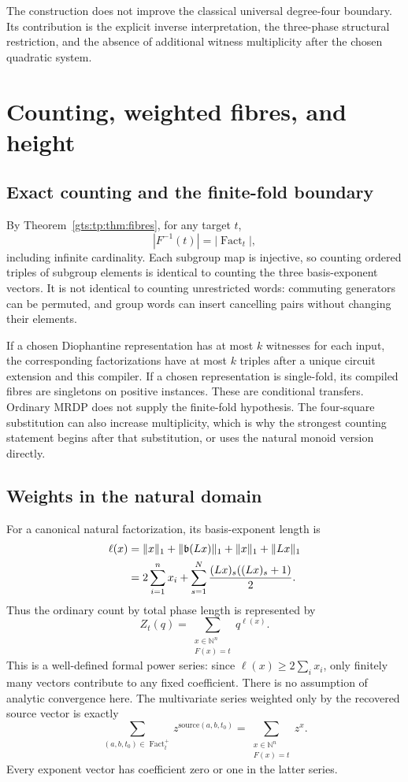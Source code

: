 \documentclass[11pt,letterpaper]{article}
\theoremstyle{definition}
\theoremstyle{remark}
\newcommand{\F}{F(a,b)}
\newcommand{\NN}{\mathbb N}
\newcommand{\bn}{\mathfrak b}
\DeclareMathOperator{\Fact}{Fact}
\begin{document}
The construction does not improve the classical universal degree-four
boundary. Its contribution is the explicit inverse interpretation, the
three-phase structural restriction, and the absence of additional witness
multiplicity after the chosen quadratic system.

\section{Counting, weighted fibres, and height}
\label{gts:tp:sec:height}

\subsection{Exact counting and the finite-fold boundary}
By Theorem~\ref{gts:tp:thm:fibres}, for any target $t$,
\[
                     |F^{-1}(t)|=|\Fact_t|,
\]
including infinite cardinality. Each subgroup map is injective, so counting
ordered triples of subgroup elements is identical to counting the three
basis-exponent vectors. It is not identical to counting unrestricted words:
commuting generators can be permuted, and group words can insert cancelling
pairs without changing their elements.

If a chosen Diophantine representation has at most $k$ witnesses for each
input, the corresponding factorizations have at most $k$ triples after a
unique circuit extension and this compiler. If a chosen representation is
single-fold, its compiled fibres are singletons on positive instances.
These are conditional transfers. Ordinary MRDP does not supply the
finite-fold hypothesis. The four-square substitution can also increase
multiplicity, which is why the strongest counting statement begins after
that substitution, or uses the natural monoid version directly.

\subsection{Weights in the natural domain}
For a canonical natural factorization, its basis-exponent length is
\begin{align}
 \ell(x)&=\|x\|_1+\|\bn(Lx)\|_1+\|x\|_1+\|Lx\|_1\notag\\
        &=2\sum_{i=1}^n x_i
          +\sum_{s=1}^N\frac{(Lx)_s((Lx)_s+1)}2.
 \label{gts:tp:eq:length}
\end{align}
Thus the ordinary count by total phase length is represented by
\begin{equation}\label{gts:tp:eq:series}
            Z_t(q)=\sum_{\substack{x\in\NN^n\\F(x)=t}}q^{\ell(x)}.
\end{equation}
This is a well-defined formal power series: since $\ell(x)\geq2\sum_i x_i$,
only finitely many vectors contribute to any fixed coefficient. There is no
assumption of analytic convergence here. The multivariate series weighted
only by the recovered source vector is exactly
\[
       \sum_{(a,b,t_0)\in\Fact_t^+}z^{\mathrm{source}(a,b,t_0)}
           =\sum_{\substack{x\in\NN^n\\F(x)=t}}z^x.
\]
Every exponent vector has coefficient zero or one in the latter series.
\end{document}
